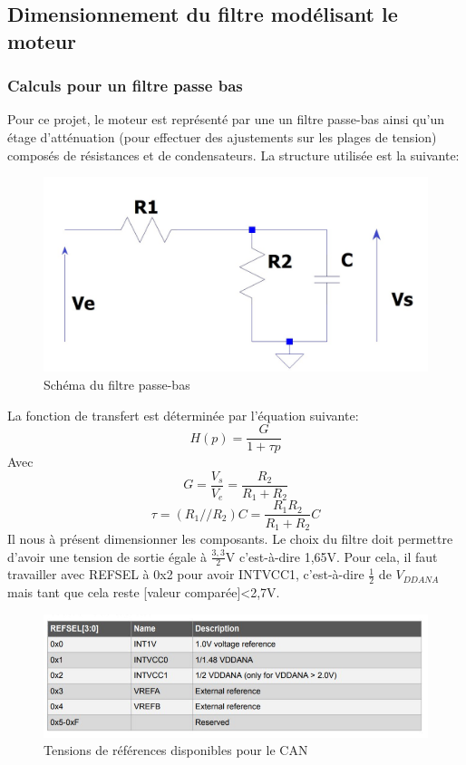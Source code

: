 \documentclass[a4paper]{article}
\begin{document}
\subsection{Dimensionnement du filtre modélisant le moteur}
	\subsubsection{Calculs pour un filtre passe bas}
	Pour ce projet, le moteur est représenté par une un filtre passe-bas ainsi qu’un étage d’atténuation (pour effectuer des ajustements sur les plages de tension) composés de résistances et de condensateurs. La structure utilisée est la suivante:	
	\begin{figure}[H]
	\centering
	\includegraphics[width=0.6\linewidth]{filtre_RC.jpg}
	\caption{Schéma du filtre passe-bas}
    \end{figure}
    La fonction de transfert est déterminée par l’équation suivante:
    \begin{equation}
		H(p)={\frac {G}{1+\tau p}}
	\end{equation}
	Avec
	\begin{equation}\label{key1}
		G={\frac {V_s}{V_e}}={\frac {R_{2}} {R_{1}+R_{2}}}
	\end{equation}
	\begin{equation}\label{key2}
		\tau=(R_{1}//R_{2}) C={\frac {R_{1}R_{2}} {R_{1}+R_{2}}}C
	\end{equation}
	Il nous à présent dimensionner les composants. Le choix du filtre doit permettre d’avoir une tension de sortie égale à $\frac {3,3}{2}$V c’est-à-dire 1,65V. Pour cela, il faut travailler avec REFSEL à 0x2 pour avoir INTVCC1, c’est-à-dire $\frac 12$ de $V_{DDANA}$ mais tant que cela reste [valeur comparée]\textless2,7V.\\
	\begin{figure}[H]
	\centering
	\includegraphics[width=0.8\linewidth]{Reference Selection_ADC.jpg}
	\caption{Tensions de références disponibles pour le CAN}
    \end{figure}
\end{document}
